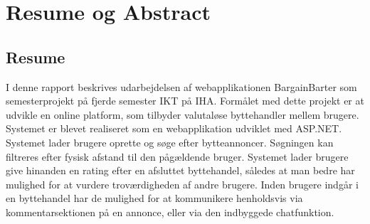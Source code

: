 \chapter{Resume og Abstract}


\section{Resume}
I denne rapport beskrives udarbejdelsen af webapplikationen BargainBarter som semesterprojekt på fjerde semester IKT på IHA. Formålet med dette projekt er at udvikle en online platform, som tilbyder valutaløse byttehandler mellem brugere.
\\ Systemet er blevet realiseret som en webapplikation udviklet med ASP.NET. Systemet lader brugere oprette og søge efter bytteannoncer. Søgningen kan filtreres efter fysisk afstand til den pågældende bruger. Systemet lader brugere give hinanden en rating efter en afsluttet byttehandel, således at man bedre har mulighed for at vurdere troværdigheden af andre brugere. Inden brugere indgår i en byttehandel har de mulighed for at kommunikere henholdsvis via kommentarsektionen på en annonce, eller via den indbyggede chatfunktion.


